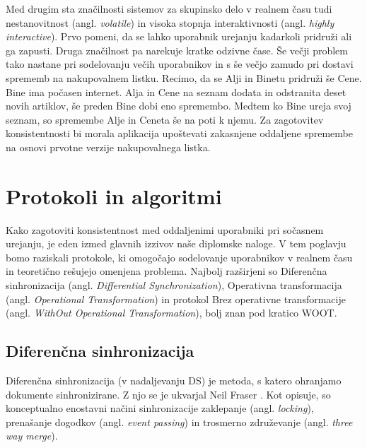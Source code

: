 \documentclass[a4paper, 12pt, twoside]{book}
\begin{document}
Med drugim sta značilnosti sistemov za skupinsko delo v realnem času \cite{ccigs} tudi nestanovitnost (angl. \textit{volatile}) in visoka stopnja interaktivnosti (angl. \textit{highly interactive}). Prvo pomeni, da se lahko uporabnik urejanju kadarkoli pridruži ali ga zapusti. Druga značilnost pa narekuje kratke odzivne čase. Še večji problem tako nastane pri sodelovanju večih uporabnikov in s še večjo zamudo pri dostavi sprememb na nakupovalnem listku. Recimo, da se Alji in Binetu pridruži še Cene. Bine ima počasen internet. Alja in Cene na seznam dodata in odstranita deset novih artiklov, še preden Bine dobi eno spremembo. Medtem ko Bine ureja svoj seznam, so spremembe Alje in Ceneta še na poti k njemu. Za zagotovitev konsistentnosti bi morala aplikacija upoštevati zakasnjene oddaljene spremembe na osnovi prvotne verzije nakupovalnega listka.

\chapter{Protokoli in algoritmi}
\label{chp:protalg}

Kako zagotoviti konsistentnost med oddaljenimi uporabniki pri sočasnem urejanju, je eden izmed glavnih izzivov naše diplomske naloge. V tem poglavju bomo raziskali protokole, ki omogočajo sodelovanje uporabnikov v realnem času in teoretično rešujejo omenjena problema. Najbolj razširjeni so Diferenčna sinhronizacija (angl. \textit{Differential Synchronization}), Operativna transformacija (angl. \textit{Operational Transformation}) in protokol Brez operativne transformacije (angl. \textit{WithOut Operational Transformation}), bolj znan pod kratico WOOT.

\section{Diferenčna sinhronizacija}
\label{sec:ds}

Diferenčna sinhronizacija (v nadaljevanju DS) je metoda, s katero ohranjamo dokumente sinhronizirane. Z njo se je ukvarjal Neil Fraser \cite{diffsync}. Kot opisuje, so konceptualno enostavni načini sinhronizacije zaklepanje (angl. \textit{locking}), prenašanje dogodkov (angl. \textit{event passing}) in trosmerno združevanje (angl. \textit{three way merge}).
\end{document}

